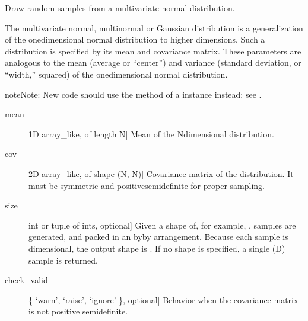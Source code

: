 \documentclass[letterpaper,10pt,english]{sphinxmanual}
\begin{document}
\begin{fulllineitems}
\label{\detokenize{infrapy.utils:infrapy.utils.ref2sac.multivariate_normal}}
Draw random samples from a multivariate normal distribution.

The multivariate normal, multinormal or Gaussian distribution is a
generalization of the one\sphinxhyphen{}dimensional normal distribution to higher
dimensions.  Such a distribution is specified by its mean and
covariance matrix.  These parameters are analogous to the mean
(average or “center”) and variance (standard deviation, or “width,”
squared) of the one\sphinxhyphen{}dimensional normal distribution.

\begin{sphinxadmonition}{note}{Note:}
New code should use the  method of a 
instance instead; see .
\end{sphinxadmonition}
\begin{description}
\item[{mean}] \leavevmode{[}1\sphinxhyphen{}D array\_like, of length N{]}
Mean of the N\sphinxhyphen{}dimensional distribution.

\item[{cov}] \leavevmode{[}2\sphinxhyphen{}D array\_like, of shape (N, N){]}
Covariance matrix of the distribution. It must be symmetric and
positive\sphinxhyphen{}semidefinite for proper sampling.

\item[{size}] \leavevmode{[}int or tuple of ints, optional{]}
Given a shape of, for example, ,  samples are
generated, and packed in an \sphinxhyphen{}by\sphinxhyphen{}\sphinxhyphen{}by\sphinxhyphen{} arrangement.  Because
each sample is \sphinxhyphen{}dimensional, the output shape is .
If no shape is specified, a single (\sphinxhyphen{}D) sample is returned.

\item[{check\_valid}] \leavevmode{[}\{ ‘warn’, ‘raise’, ‘ignore’ \}, optional{]}
Behavior when the covariance matrix is not positive semidefinite.


\end{description}
\end{fulllineitems}
\end{document}
